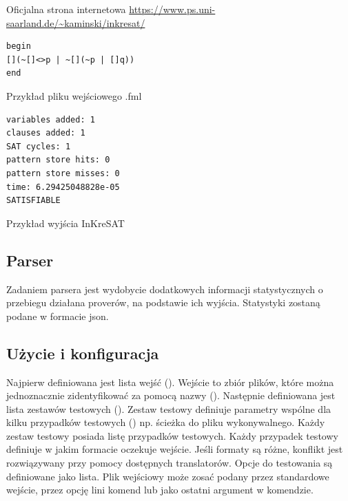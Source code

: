 \documentclass[a4paper,12pt]{article}
\newenvironment{longlisting}{\captionsetup{type=listing}}{}
\begin{document}
\noindent
Oficjalna strona internetowa \url{https://www.ps.uni-saarland.de/~kaminski/inkresat/}


\begin{longlisting}
  \begin{verbatim}
begin
[](~[]<>p | ~[](~p | []q))
end
  \end{verbatim}
   \caption{Przykład pliku wejściowego .fml}
\end{longlisting}

\begin{longlisting}

  \begin{verbatim}
variables added: 1
clauses added: 1
SAT cycles: 1
pattern store hits: 0
pattern store misses: 0
time: 6.29425048828e-05
SATISFIABLE
  \end{verbatim}
   \caption{Przykład wyjścia InKreSAT}
\end{longlisting}

\newpage
\subsection{Parser} \label{parser}

Zadaniem parsera jest wydobycie dodatkowych informacji statystycznych o przebiegu działana proverów, na podstawie ich wyjścia. Statystyki zostaną podane w formacie json.


\subsection{Użycie i konfiguracja} \label{benchmarkUsage}

Najpierw definiowana jest lista wejść (). Wejście to zbiór plików, które można jednoznacznie zidentyfikować za pomocą nazwy ().
Następnie definiowana jest lista zestawów testowych (). Zestaw testowy definiuje parametry wspólne dla kilku przypadków testowych () np. ścieżka do pliku wykonywalnego. Każdy zestaw testowy posiada listę przypadków testowych. Każdy przypadek testowy definiuje w jakim formacie oczekuje wejście. Jeśli formaty są różne, konflikt jest rozwiązywany przy pomocy dostępnych translatorów. Opcje do testowania są definiowane jako lista. Plik wejściowy może zosać podany przez standardowe wejście, przez opcję lini komend lub jako ostatni argument w komendzie.
\end{document}
